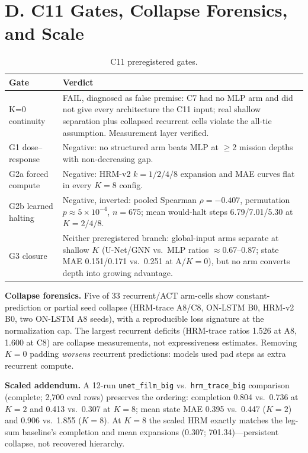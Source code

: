 \documentclass[letterpaper]{article} %
\newcommand{\stage}[1]{\textsc{#1}}
\begin{document}
\section{D. \stage{C11} Gates, Collapse Forensics, and Scale}

\begin{table}[h]
\centering
\footnotesize
\begin{tabular}{@{}lp{5.2cm}@{}}
\toprule
Gate & Verdict \\
\midrule
K=0 continuity & FAIL, diagnosed as false premise: \stage{C7} had no MLP arm and did not give every architecture the \stage{C11} input; real shallow separation plus collapsed recurrent cells violate the all-tie assumption. Measurement layer verified. \\
G1 dose--response & Negative: no structured arm beats MLP at $\geq$2 mission depths with non-decreasing gap. \\
G2a forced compute & Negative: HRM-v2 $k{=}1/2/4/8$ expansion and MAE curves flat in every $K{=}8$ config. \\
G2b learned halting & Negative, inverted: pooled Spearman $\rho{=}-0.407$, permutation $p{\approx}5{\times}10^{-4}$, $n{=}675$; mean would-halt steps 6.79/7.01/5.30 at $K{=}2/4/8$. \\
G3 closure & Neither preregistered branch: global-input arms separate at shallow $K$ (U-Net/GNN vs.\ MLP ratios $\approx$0.67--0.87; state MAE 0.151/0.171 vs.\ 0.251 at A/$K{=}0$), but no arm converts depth into growing advantage. \\
\bottomrule
\end{tabular}
\caption{\stage{C11} preregistered gates.}
\label{tab:c11gates}
\end{table}

\textbf{Collapse forensics.} Five of 33 recurrent/ACT arm-cells show constant-prediction or partial seed collapse (HRM-trace A8/C8, ON-LSTM B0, HRM-v2 B0, two ON-LSTM A8 seeds), with a reproducible loss signature at the normalization cap. The largest recurrent deficits (HRM-trace ratios 1.526 at A8, 1.600 at C8) are collapse measurements, not expressiveness estimates. Removing $K{=}0$ padding \emph{worsens} recurrent predictions: models used pad steps as extra recurrent compute.

\textbf{Scaled addendum.} A 12-run \texttt{unet\_film\_big} vs.\ \texttt{hrm\_trace\_big} comparison (complete; 2{,}700 eval rows) preserves the ordering: completion 0.804 vs.\ 0.736 at $K{=}2$ and 0.413 vs.\ 0.307 at $K{=}8$; mean state MAE 0.395 vs.\ 0.447 ($K{=}2$) and 0.906 vs.\ 1.855 ($K{=}8$). At $K{=}8$ the scaled HRM exactly matches the leg-sum baseline's completion and mean expansions (0.307; 701.34)---persistent collapse, not recovered hierarchy.
\end{document}
